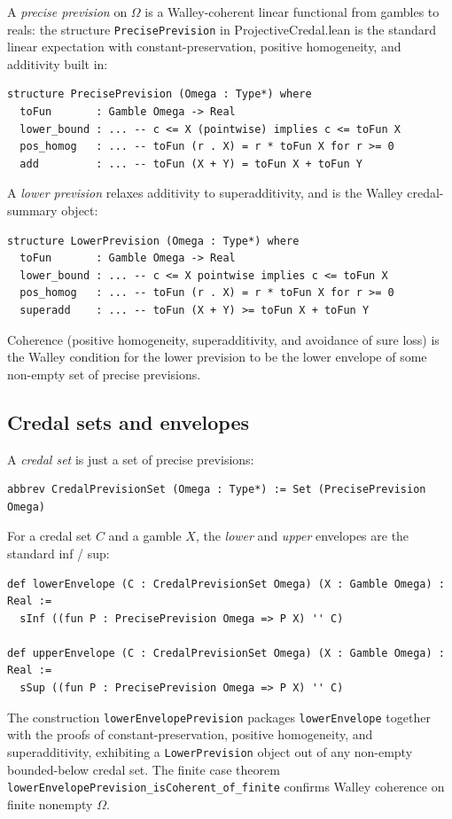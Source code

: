 \documentclass[]{article}
\newcommand{\lid}[1]{{\ttfamily\nolinkurl{#1}}}
\begin{document}
A \emph{precise prevision} on $\Omega$ is a Walley-coherent linear
functional from gambles to reals: the structure
\lid{PrecisePrevision} in ProjectiveCredal.lean is the standard linear
expectation with constant-preservation, positive homogeneity, and
additivity built in:
\begin{lstlisting}
structure PrecisePrevision (Omega : Type*) where
  toFun       : Gamble Omega -> Real
  lower_bound : ... -- c <= X (pointwise) implies c <= toFun X
  pos_homog   : ... -- toFun (r . X) = r * toFun X for r >= 0
  add         : ... -- toFun (X + Y) = toFun X + toFun Y
\end{lstlisting}

A \emph{lower prevision} relaxes additivity to superadditivity, and is
the Walley credal-summary object:
\begin{lstlisting}
structure LowerPrevision (Omega : Type*) where
  toFun       : Gamble Omega -> Real
  lower_bound : ... -- c <= X pointwise implies c <= toFun X
  pos_homog   : ... -- toFun (r . X) = r * toFun X for r >= 0
  superadd    : ... -- toFun (X + Y) >= toFun X + toFun Y
\end{lstlisting}
Coherence (positive homogeneity, superadditivity, and avoidance of sure
loss) is the Walley condition for the lower prevision to be the
lower envelope of some non-empty set of precise previsions.

\subsection{Credal sets and envelopes}

A \emph{credal set} is just a set of precise previsions:
\begin{lstlisting}
abbrev CredalPrevisionSet (Omega : Type*) := Set (PrecisePrevision Omega)
\end{lstlisting}

For a credal set $C$ and a gamble $X$, the \emph{lower} and \emph{upper}
envelopes are the standard inf / sup:
\begin{lstlisting}
def lowerEnvelope (C : CredalPrevisionSet Omega) (X : Gamble Omega) : Real :=
  sInf ((fun P : PrecisePrevision Omega => P X) '' C)

def upperEnvelope (C : CredalPrevisionSet Omega) (X : Gamble Omega) : Real :=
  sSup ((fun P : PrecisePrevision Omega => P X) '' C)
\end{lstlisting}
The construction
\lid{lowerEnvelopePrevision} packages \lid{lowerEnvelope} together with
the proofs of constant-preservation, positive homogeneity, and
superadditivity, exhibiting a \lid{LowerPrevision} object out of any
non-empty bounded-below credal set. The finite case theorem
\lid{lowerEnvelopePrevision\_isCoherent\_of\_finite}
confirms Walley coherence on finite
nonempty $\Omega$.
\end{document}
